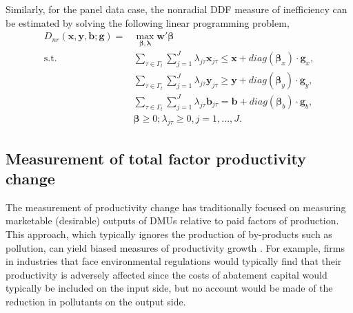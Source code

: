 Similarly, for the panel data case, the nonradial DDF measure of inefficiency can be estimated by solving the following linear programming problem,
\begin{equation}\begin{split}\label{eq_eff_nr_panel}
    D_{nr} (\pmb{x},\pmb{y},\pmb{b};\pmb{g}) 
    = &\max _{\pmb{\beta},\pmb{\lambda}} \pmb{w'} \pmb{\beta}  \\ 
    \text{s.t.} &\sum\limits_{\tau \in \Gamma_t }\sum\limits_{j = 1}^J {{\lambda _{j\tau}}{{\pmb{x}}_{j\tau}} \le \pmb{x} + diag(\pmb{\beta}_x)\cdot \pmb{g}_x}, \\ 
                &\sum\limits_{\tau \in \Gamma_t }\sum\limits_{j = 1}^J {{\lambda _{j\tau}}{{\pmb{y}}_{j\tau}} \ge \pmb{y} + diag(\pmb{\beta}_y)\cdot \pmb{g}_y}, \\ 
                &\sum\limits_{\tau \in \Gamma_t }\sum\limits_{j = 1}^J {{\lambda _{j\tau}}{{\pmb{b}}_{j\tau}} = \pmb{b} + diag(\pmb{\beta}_b)\cdot \pmb{g}_b}, \\ 
                &\pmb{\beta} \ge 0; \lambda_{j\tau} \ge 0, j = 1,...,J.
\end{split}\end{equation}


\subsection{Measurement of total factor productivity change}
The measurement of productivity change has traditionally focused on measuring marketable (desirable) outputs of DMUs relative to paid factors of production. 
This approach, which typically ignores the production of by-products such as pollution, can yield biased measures of productivity growth \citep{Chung1997}. 
For example, firms in industries that face environmental regulations would typically find that their productivity is adversely affected since the costs of abatement capital would typically be included on the input side, but no account would be made of the reduction in pollutants on the output side.

